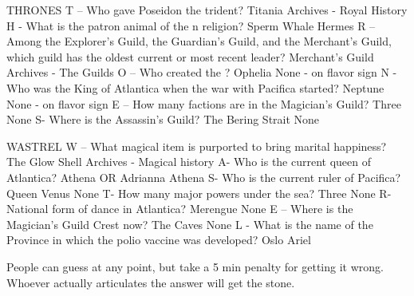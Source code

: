 \documentclass[green]{NeptuneBall}
\begin{document}
\name{\gWishingStone{}}

THRONES
T – Who gave Poseidon the trident?
Titania
Archives - Royal History
H - What is the patron animal of the \pAtlantica{}n religion?
Sperm Whale
Hermes
R –  Among the Explorer's Guild, the Guardian's Guild, and the Merchant's Guild, which guild has the oldest current or most recent leader?
Merchant’s Guild
Archives - The Guilds
O – Who created the \sArtifactTwo{}?
Ophelia
None - on flavor sign
N - Who was the King of Atlantica when the war with Pacifica started?
Neptune
None - on flavor sign
E – How many factions are in the Magician’s Guild?
Three
None
S- Where is the Assassin's Guild?
The Bering Strait
None

WASTREL
W – What magical item is purported to bring marital happiness?
The Glow Shell
Archives - Magical history
A- Who is the current queen of Atlantica?
Athena OR Adrianna
Athena
S- Who is the current ruler of Pacifica?
Queen Venus
None
T- How many major powers under the sea?
Three
None
R- National form of dance in Atlantica?
Merengue
None
E – Where is the Magician’s Guild Crest now?
The Caves
None
L - What is the name of the Province in which the polio vaccine was developed?
Oslo
Ariel

People can guess at any point, but take a 5 min penalty for getting it wrong. Whoever actually articulates the answer will get the stone.
\end{document}
